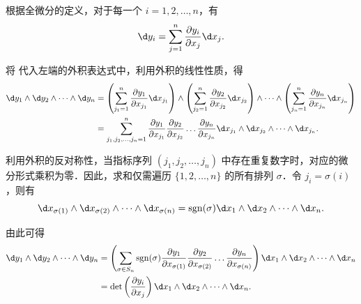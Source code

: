 \begin{myproof}
    根据全微分的定义，对于每一个 $i = 1, 2, \dots, n$，有
    \begin{equation}
        \d y_i = \sum_{j=1}^n \frac{\partial y_i}{\partial x_j} \d x_j. \label{eq:diff-definition-1}
    \end{equation}

    将  代入左端的外积表达式中，利用外积的线性性质，得
    \begin{equation}
        \begin{aligned}
            \d y_1 \wedge \d y_2 \wedge \dots \wedge \d y_n & = \left( \sum_{j_1=1}^n \frac{\partial y_1}{\partial x_{j_1}} \d x_{j_1} \right) \wedge \left( \sum_{j_2=1}^n \frac{\partial y_2}{\partial x_{j_2}} \d x_{j_2} \right) \wedge \dots \wedge \left( \sum_{j_n=1}^n \frac{\partial y_n}{\partial x_{j_n}} \d x_{j_n} \right) \\
                                                            & = \sum_{j_1, j_2, \dots, j_n = 1}^n \frac{\partial y_1}{\partial x_{j_1}} \frac{\partial y_2}{\partial x_{j_2}} \dots \frac{\partial y_n}{\partial x_{j_n}} \d x_{j_1} \wedge \d x_{j_2} \wedge \dots \wedge \d x_{j_n}.
        \end{aligned}
    \end{equation}

    利用外积的反对称性，当指标序列 $(j_1, j_2, \dots, j_n)$ 中存在重复数字时，对应的微分形式乘积为零．因此，求和仅需遍历 $\{1, 2, \dots, n\}$ 的所有排列 $\sigma$．令 $j_i = \sigma(i)$，则有
    \begin{equation}
        \d x_{\sigma(1)} \wedge \d x_{\sigma(2)} \wedge \dots \wedge \d x_{\sigma(n)} = \operatorname{sgn}(\sigma) \d x_1 \wedge \d x_2 \wedge \dots \wedge \d x_n.
    \end{equation}

    由此可得
    \begin{equation}
        \begin{aligned}
            \d y_1 \wedge \d y_2 \wedge \dots \wedge \d y_n & = \left( \sum_{\sigma \in S_n} \operatorname{sgn}(\sigma) \frac{\partial y_1}{\partial x_{\sigma(1)}} \frac{\partial y_2}{\partial x_{\sigma(2)}} \dots \frac{\partial y_n}{\partial x_{\sigma(n)}} \right) \d x_1 \wedge \d x_2 \wedge \dots \wedge \d x_n \\
                                                            & = \det \left( \frac{\partial y_i}{\partial x_j} \right) \d x_1 \wedge \d x_2 \wedge \dots \wedge \d x_n.
        \end{aligned}
    \end{equation}


\end{myproof}

